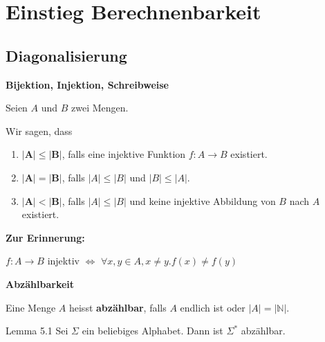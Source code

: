 \documentclass[a4paper, 11pt]{article}
\def\N{\mathbb{N}}
\begin{document}
   





    
        \section{Einstieg Berechnenbarkeit}
        
        \subsection{Diagonalisierung}
        
        
            \textbf{Bijektion, Injektion, Schreibweise}
            \begin{mainbox}{}
                Seien $A$ und $B$ zwei Mengen.
        
                Wir sagen, dass 
                \begin{enumerate}[label=\roman*.]
                    \item $\mathbf{|A| \leq |B|}$, falls eine injektive Funktion $f: A \to B$ existiert.
                    \item $\mathbf{|A| = |B|}$, falls $|A| \leq |B|$ und $|B| \leq |A|$.
                    \item $\mathbf{|A| < |B|}$, falls $|A| \leq |B|$ und keine injektive Abbildung von $B$ nach $A$ existiert.
                \end{enumerate}
            \end{mainbox}
            \textbf{Zur Erinnerung:}
            \begin{center}
                $f: A \to B$ injektiv $\iff $ $\forall x,y \in A, x\neq y. f(x) \neq f(y)$
            \end{center}
        
        
        
            \textbf{Abzählbarkeit}
            \begin{mainbox}
                Eine Menge $A$ heisst \textbf{abzählbar}, falls $A$ endlich ist oder $|A| = |\N|$.
            \end{mainbox}
            \begin{subbox}{Lemma 5.1}
            Sei $\Sigma$ ein beliebiges Alphabet. Dann ist $\Sigma^*$ abzählbar.
            \end{subbox}
        
        
\end{document}
